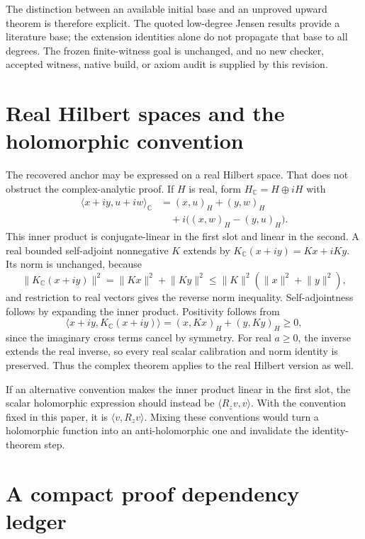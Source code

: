 \documentclass[11pt,a4paper]{article}
\numberwithin{equation}{section}
\theoremstyle{definition}
\theoremstyle{remark}
\newcommand{\C}{\mathbb C}
\newcommand{\ip}[2]{\langle #1,#2\rangle}
\newcommand{\norm}[1]{\lVert #1\rVert}
\begin{document}
The distinction between an available initial base and an unproved
upward theorem is therefore explicit. The quoted low-degree Jensen
results provide a literature base; the extension identities alone do
not propagate that base to all degrees. The frozen finite-witness
goal is unchanged, and no new checker, accepted witness, native build,
or axiom audit is supplied by this revision.

\appendix
\section[Real Hilbert spaces]{Real Hilbert spaces and the holomorphic convention}\label{app:real}

The recovered anchor may be expressed on a real Hilbert space.
That does not obstruct the complex-analytic proof. If $H$ is real,
form $H_\C=H\oplus iH$ with
\begin{align*}
\ip{x+iy}{u+iw}_{\C}
&=(x,u)_H+(y,w)_H\\
&\quad+i\bigl((x,w)_H-(y,u)_H\bigr).
\end{align*}
This inner product is conjugate-linear in the first slot and linear
in the second. A real bounded self-adjoint nonnegative $K$ extends
by $K_\C(x+iy)=Kx+iKy$. Its norm is unchanged, because
\[
\norm{K_\C(x+iy)}^2=\norm{Kx}^2+\norm{Ky}^2
\leq\norm K^2(\norm x^2+\norm y^2),
\]
and restriction to real vectors gives the reverse norm inequality.
Self-adjointness follows by expanding the inner product. Positivity
follows from
\[
\ip{x+iy}{K_\C(x+iy)}=(x,Kx)_H+(y,Ky)_H\geq0,
\]
since the imaginary cross terms cancel by symmetry.
For real $a\geq0$, the inverse extends the real inverse, so every
real scalar calibration and norm identity is preserved. Thus the
complex theorem applies to the real Hilbert version as well.

If an alternative convention makes the inner product linear in the
first slot, the scalar holomorphic expression should instead be
$\ip{R_zv}{v}$. With the convention fixed in this paper, it is
$\ip v{R_zv}$. Mixing these conventions would turn a holomorphic
function into an anti-holomorphic one and invalidate the identity-theorem
step.

\section[Proof dependencies]{A compact proof dependency ledger}\label{app:ledger}
\end{document}
